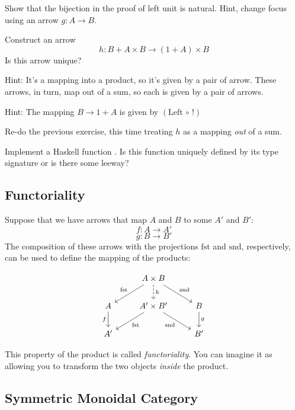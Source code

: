 \documentclass[DaoFP]{subfiles}
\begin{document}
\begin{exercise}
Show that the bijection in the proof of left unit is natural. Hint, change focus using an arrow $g \colon A \to B$.
\end{exercise}

\begin{exercise}
Construct an arrow 
\[ h \colon B + A \times B \to (1 + A) \times B \]
Is this arrow unique?

Hint: It's a mapping into a product, so it's given by a pair of arrow. These arrows, in turn, map out of a sum, so each is given by a pair of arrows. 

Hint: The mapping $B \to 1 + A$ is given by $(\text{Left} \, \circ \, !)$
\end{exercise}

\begin{exercise}
Re-do the previous exercise, this time treating $h$ as a mapping \emph{out} of a sum. 
\end{exercise}

\begin{exercise}
Implement a Haskell function . Is this function uniquely defined by its type signature or is there some leeway?
\end{exercise}

\subsection{Functoriality}

Suppose that we have arrows that map $A$ and $B$ to some $A'$ and $B'$:
\[f \colon A \to A' \]
\[g \colon B \to B'\]
The composition of these arrows with the projections $\text{fst}$ and $\text{snd}$, respectively, can be used to define the mapping of the products:

\[
 \begin{tikzcd}
 & A \times B
\arrow[d, dashed, "h"]
 \arrow[dl,  "\text{fst}"']
 \arrow[dr,   "\text{snd}"]
\\
A
\arrow[d, "f"']
&A' \times B'
 \arrow[dl,  "\text{fst}"]
  \arrow[dr,   "\text{snd}"']
& B
\arrow[d, "g"]
\\
A' && B'
 \end{tikzcd}
\]

This property of the product is called \emph{functoriality}. You can imagine it as allowing you to transform the two objects \emph{inside} the product. 

\subsection{Symmetric Monoidal Category}
\end{document}
